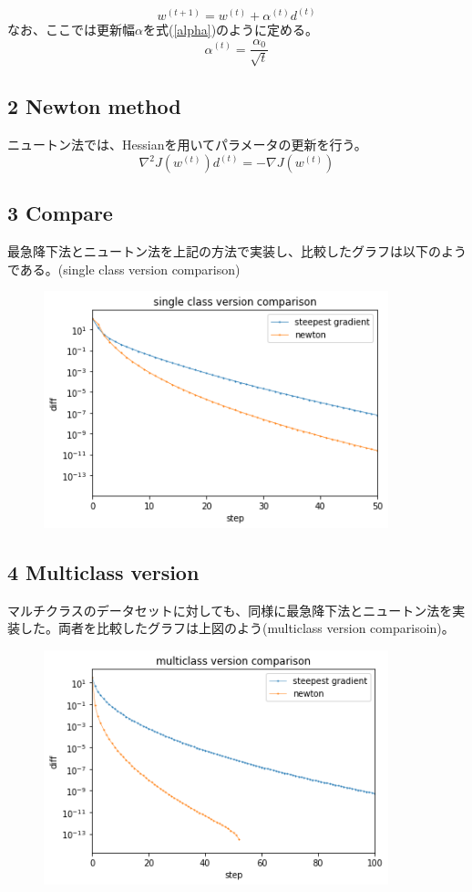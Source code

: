 \documentclass[a4j,11pt]{jarticle}
\begin{document}
\begin{equation}
    w^{(t+1)} = w^{(t)} + \alpha^{(t)} d^{(t)}
\end{equation}
なお、ここでは更新幅$\alpha$を式(\ref{alpha})のように定める。
\begin{equation}
    \alpha^{(t)} = \frac{\alpha_{0}}{\sqrt{t}}\label{alpha}
\end{equation}

\subsection*{2 Newton method}
ニュートン法では、Hessianを用いてパラメータの更新を行う。
\begin{equation}
    \nabla^2J(w^{(t)})d^{(t)} = -\nabla J(w^{(t)})
\end{equation}

\url{}
\subsection*{3 Compare}
最急降下法とニュートン法を上記の方法で実装し、比較したグラフは以下のようである。(single class version comparison) 

\begin{figure}
    \centering
    \includegraphics[width=10cm]{p1-1.png}
\end{figure}

\newpage
\subsection*{4 Multiclass version}
マルチクラスのデータセットに対しても、同様に最急降下法とニュートン法を実装した。両者を比較したグラフは上図のよう(multiclass version comparisoin)。

\begin{figure}
    \centering
    \includegraphics[width=10cm]{p1-4.png}
\end{figure}
\end{document}
